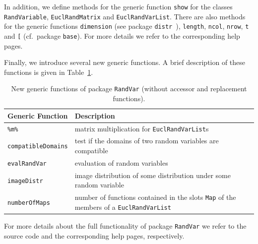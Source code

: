 \documentclass[11pt]{article}
\begin{document}
In addition, we define methods for the generic function {\tt show} for the classes
{\tt RandVariable}, {\tt EuclRandMatrix} and {\tt EuclRandVarList}. There are 
also methods for the generic functions {\tt dimension} (see package 
{\tt distr}~\cite{distr}), {\tt length}, {\tt ncol}, {\tt nrow}, {\tt t} and 
{\tt [} (cf.\ package {\tt base}). For more details we refer to the corresponding 
help pages.
\par
Finally, we introduce several new generic functions. A brief description
of these functions is given in Table~\ref{ap.Rpack.RandVar.tab}.
\begin{table}[!ht]
\begin{center}
\begin{tabular}{p{3.5cm}|p{8cm}}
  \textbf{Generic Function} & \textbf{Description} \\ \hline\hline
  \texttt{\%m\%} & matrix multiplication for {\tt EuclRandVarList}s \\ \hline
  \texttt{compatibleDomains} & test if the domains of two random variables
                     are compatible \\ \hline
  \texttt{evalRandVar} & evaluation of random variables\\ \hline
  \texttt{imageDistr} & image distribution of some distribution under some
               random variable \\ \hline
  \texttt{numberOfMaps} & number of functions contained in the slots {\tt Map}
                 of the members of a {\tt EuclRandVarList}
\end{tabular}
\caption[New Generic Functions of Package {\tt RandVar}]
{New generic functions of package {\tt RandVar} (without accessor
and replacement functions).}\label{ap.Rpack.RandVar.tab}%
\end{center}
\end{table}
\par\noindent
For more details about the full functionality of package {\tt RandVar}
we refer to the source code and the corresponding help pages, respectively.
\end{document}
